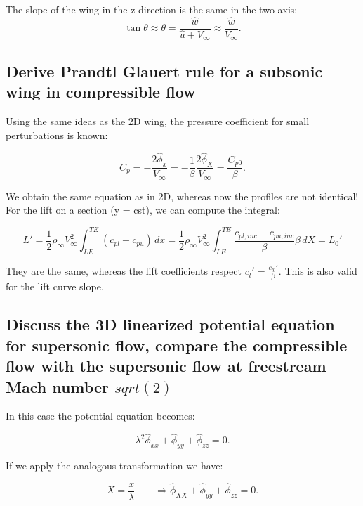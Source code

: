 \documentclass[british,french,11pt, a4paper, openany]{article}
\begin{document}
The slope of the wing in the z-direction is the same in the two axis: 
\begin{equation}
\tan \theta \approx \theta = \frac{\hat{w}}{\hat{u}+V_\infty} \approx \frac{\hat{w}}{V_\infty}. 
\end{equation}



\subsection{Derive Prandtl Glauert rule for a subsonic wing in compressible flow}
Using the same ideas as the 2D wing, the pressure coefficient for small perturbations is known: 

\begin{equation}
C_p = -\frac{2\hat{\phi}_{x}}{V_\infty} = -\frac{1}{\beta}\frac{2\hat{\phi}_{X}}{V_\infty} = \frac{C_{p0}}{\beta}.
\end{equation}

We obtain the same equation as in 2D, whereas now the profiles are not identical! For the lift on a section (y = cst), we can compute the integral:

\begin{equation}
L' = \frac{1}{2} \rho _\infty V_\infty ^2\int _{LE} ^{TE} (c_{pl} - c_{pu})\, dx
= \frac{1}{2} \rho _\infty V_\infty ^2\int _{LE} ^{TE} \frac{c_{pl,inc} - c_{pu,inc}}{\beta} \beta\, dX = L_0'
\end{equation}

They are the same, whereas the lift coefficients respect $c_l' = \frac{c_{l0}'}{\beta}$. This is also valid for the lift curve slope.

\subsection{Discuss the 3D linearized potential equation for supersonic flow, compare the compressible flow with the supersonic flow at freestream Mach number $sqrt(2)$}
In this case the potential equation becomes:

\begin{equation}
\lambda ^2 \hat{\phi} _{xx} + \hat{\phi} _{yy} + \hat{\phi} _{zz} = 0.
\end{equation}

If we apply the analogous transformation we have:

\begin{equation}
X = \frac{x}{\lambda} \qquad \Rightarrow  \hat{\phi} _{XX} + \hat{\phi} _{yy} + \hat{\phi} _{zz} = 0.
\end{equation}
\end{document}
